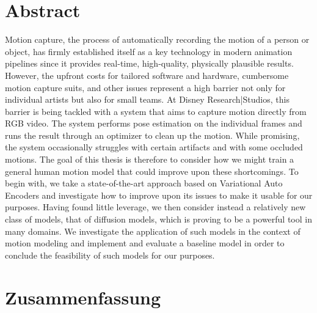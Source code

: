 \chapter*{Abstract}

Motion capture, the process of automatically recording the motion of a person or object, has firmly established itself as a key technology in modern animation pipelines since it provides real-time, high-quality, physically plausible results. However, the upfront costs for tailored software and hardware, cumbersome motion capture suits, and other issues represent a high barrier not only for individual artists but also for small teams. At Disney Research|Studios, this barrier is being tackled with a system that aims to capture motion directly from RGB video. The system performs pose estimation on the individual frames and runs the result through an optimizer to clean up the motion. While promising, the system occasionally struggles with certain artifacts and with some occluded motions. The goal of this thesis is therefore to consider how we might train a general human motion model that could improve upon these shortcomings. To begin with, we take a state-of-the-art approach based on Variational Auto Encoders and investigate how to improve upon its issues to make it usable for our purposes. Having found little leverage, we then consider instead a relatively new class of models, that of diffusion models, which is proving to be a powerful tool in many domains. We investigate the application of such models in the context of motion modeling and implement and evaluate a baseline model in order to conclude the feasibility of such models for our purposes.
 
\cleardoublepage
\chapter*{Zusammenfassung}

